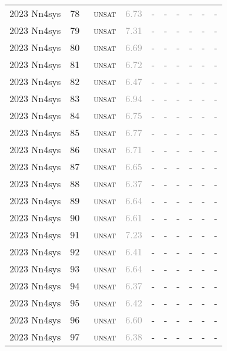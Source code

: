 \begin{center}
{\begin{longtable}{@{}llllllllll@{}}
2023 Nn4sys & 78 & ~\textsc{unsat} & \textcolor{darkgray}{6.73} & - & - & - & - & - & - \\
2023 Nn4sys & 79 & ~\textsc{unsat} & \textcolor{darkgray}{7.31} & - & - & - & - & - & - \\
2023 Nn4sys & 80 & ~\textsc{unsat} & \textcolor{darkgray}{6.69} & - & - & - & - & - & - \\
2023 Nn4sys & 81 & ~\textsc{unsat} & \textcolor{darkgray}{6.72} & - & - & - & - & - & - \\
2023 Nn4sys & 82 & ~\textsc{unsat} & \textcolor{darkgray}{6.47} & - & - & - & - & - & - \\
2023 Nn4sys & 83 & ~\textsc{unsat} & \textcolor{darkgray}{6.94} & - & - & - & - & - & - \\
2023 Nn4sys & 84 & ~\textsc{unsat} & \textcolor{darkgray}{6.75} & - & - & - & - & - & - \\
2023 Nn4sys & 85 & ~\textsc{unsat} & \textcolor{darkgray}{6.77} & - & - & - & - & - & - \\
2023 Nn4sys & 86 & ~\textsc{unsat} & \textcolor{darkgray}{6.71} & - & - & - & - & - & - \\
2023 Nn4sys & 87 & ~\textsc{unsat} & \textcolor{darkgray}{6.65} & - & - & - & - & - & - \\
2023 Nn4sys & 88 & ~\textsc{unsat} & \textcolor{darkgray}{6.37} & - & - & - & - & - & - \\
2023 Nn4sys & 89 & ~\textsc{unsat} & \textcolor{darkgray}{6.64} & - & - & - & - & - & - \\
2023 Nn4sys & 90 & ~\textsc{unsat} & \textcolor{darkgray}{6.61} & - & - & - & - & - & - \\
2023 Nn4sys & 91 & ~\textsc{unsat} & \textcolor{darkgray}{7.23} & - & - & - & - & - & - \\
2023 Nn4sys & 92 & ~\textsc{unsat} & \textcolor{darkgray}{6.41} & - & - & - & - & - & - \\
2023 Nn4sys & 93 & ~\textsc{unsat} & \textcolor{darkgray}{6.64} & - & - & - & - & - & - \\
2023 Nn4sys & 94 & ~\textsc{unsat} & \textcolor{darkgray}{6.37} & - & - & - & - & - & - \\
2023 Nn4sys & 95 & ~\textsc{unsat} & \textcolor{darkgray}{6.42} & - & - & - & - & - & - \\
2023 Nn4sys & 96 & ~\textsc{unsat} & \textcolor{darkgray}{6.60} & - & - & - & - & - & - \\
2023 Nn4sys & 97 & ~\textsc{unsat} & \textcolor{darkgray}{6.38} & - & - & - & - & - & - \\

\end{longtable}}
\end{center}
